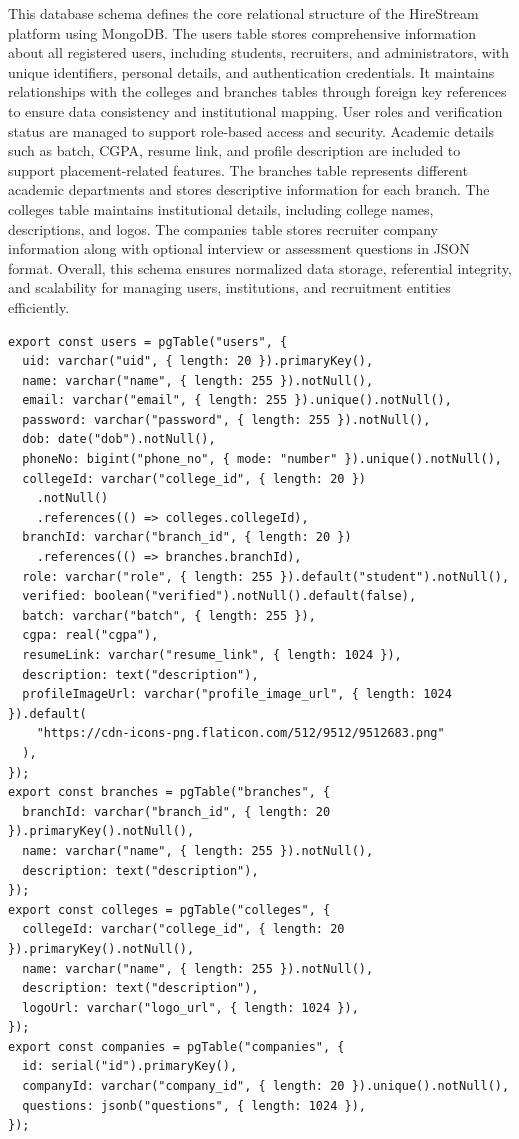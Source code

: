 \documentclass[a4paper, 12pt]{report}
\begin{document}
This database schema defines the core relational structure of the HireStream platform using MongoDB. The users table stores comprehensive information about all registered users, including students, recruiters, and administrators, with unique identifiers, personal details, and authentication credentials. It maintains relationships with the colleges and branches tables through foreign key references to ensure data consistency and institutional mapping. User roles and verification status are managed to support role-based access and security. Academic details such as batch, CGPA, resume link, and profile description are included to support placement-related features. The branches table represents different academic departments and stores descriptive information for each branch. The colleges table maintains institutional details, including college names, descriptions, and logos. The companies table stores recruiter company information along with optional interview or assessment questions in JSON format. Overall, this schema ensures normalized data storage, referential integrity, and scalability for managing users, institutions, and recruitment entities efficiently.

\noindent \begin{lstlisting}
export const users = pgTable("users", {
  uid: varchar("uid", { length: 20 }).primaryKey(),
  name: varchar("name", { length: 255 }).notNull(),
  email: varchar("email", { length: 255 }).unique().notNull(),
  password: varchar("password", { length: 255 }).notNull(),
  dob: date("dob").notNull(),
  phoneNo: bigint("phone_no", { mode: "number" }).unique().notNull(),
  collegeId: varchar("college_id", { length: 20 })
    .notNull()
    .references(() => colleges.collegeId),
  branchId: varchar("branch_id", { length: 20 })
    .references(() => branches.branchId),
  role: varchar("role", { length: 255 }).default("student").notNull(),
  verified: boolean("verified").notNull().default(false),
  batch: varchar("batch", { length: 255 }),
  cgpa: real("cgpa"),
  resumeLink: varchar("resume_link", { length: 1024 }),
  description: text("description"),
  profileImageUrl: varchar("profile_image_url", { length: 1024 }).default(
    "https://cdn-icons-png.flaticon.com/512/9512/9512683.png"
  ),
});
export const branches = pgTable("branches", {
  branchId: varchar("branch_id", { length: 20 }).primaryKey().notNull(),
  name: varchar("name", { length: 255 }).notNull(),
  description: text("description"),
});
export const colleges = pgTable("colleges", {
  collegeId: varchar("college_id", { length: 20 }).primaryKey().notNull(),
  name: varchar("name", { length: 255 }).notNull(),
  description: text("description"),
  logoUrl: varchar("logo_url", { length: 1024 }),
});
export const companies = pgTable("companies", {
  id: serial("id").primaryKey(),
  companyId: varchar("company_id", { length: 20 }).unique().notNull(),
  questions: jsonb("questions", { length: 1024 }),
});
\end{lstlisting}
\end{document}
